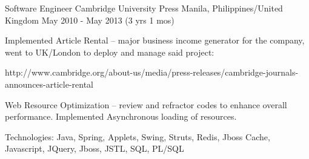 \begin{cventries}
  \cventry
  {Software Engineer} %
  {Cambridge University Press} %
  {Manila, Philippines/United Kingdom} %
  {May 2010 - May 2013 (3 yrs 1 mos)} %
  {
    \begin{cvitems} %
      \item {Implemented Article Rental – major business income generator for the company, went to UK/London to deploy and manage said project:}
      \item {http://www.cambridge.org/about-us/media/press-releases/cambridge-journals-announces-article-rental}
      \item {Web Resource Optimization – review and refractor codes to enhance overall performance. Implemented Asynchronous loading of resources.}
      \item {Technologies: Java, Spring, Applets, Swing, Struts, Redis, Jboss Cache, Javascript, JQuery, Jboss, JSTL, SQL, PL/SQL}
    \end{cvitems}
  }
\end{cventries}
